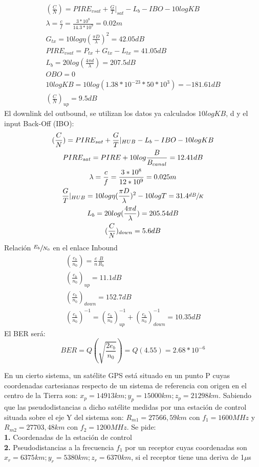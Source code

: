 \begin{exercise}[2]
\begin{gather*}
		(\frac{C}{N})=PIRE_{vsat}+\frac{G}{T}|_{sat}-L_b-IBO-10logKB\\
		\lambda=\frac{c}{f}=\frac{3*10^8}{14.3*10^9}=0.02m\\
		G_{tx}=10log\eta(\frac{\pi D}{\lambda})^2=42.05dB\\
		PIRE_{vsat}=P_{tx}+G_{tx}-L_{tx}=41.05dB\\
		L_b=20log(\frac{4\pi d}{\lambda})=207.5dB\\
		OBO=0\\
		10logKB=10log(1.38*10^{-23}*50*10^3)=-181.61dB\\
		(\frac{C}{N})_{up}=9.5dB
	\end{gather*}
	El downlink del outbound, se utilizan los datos ya calculados $10logKB$, d y el input Back-Off (IBO):
	\begin{gather*}
		(\frac{C}{N})=PIRE_{sat}+\frac{G}{T}|_{HUB}-L_b-IBO-10logKB\\
		PIRE_{sat}=PIRE+10log\frac{B}{B_{canal}}=12.41dB\\
		\lambda=\frac{c}{f}=\frac{3*10^8}{12*10^9}=0.025m\\
		\frac{G}{T}|_{HUB}=10log\eta(\frac{\pi D}{\lambda})^2-10logT=31.4\sfrac{dB}{K}\\
		L_b=20log(\frac{4\pi d}{\lambda})=205.54dB\\
		(\frac{C}{N})_{down}=5.6dB
	\end{gather*}
	Relación $\sfrac{E_b}{N_0}$ en el enlace Inbound
	\begin{gather*}
		(\frac{e_b}{n_0})=\frac{c}{n}\frac{B}{R_b}\\
		(\frac{e_b}{n_0})_{up}=11.1dB\\
		(\frac{e_b}{n_0})_{down}=152.7dB\\
		(\frac{e_b}{n_0})^{-1}=(\frac{e_b}{n_0})_{up}^{-1}+(\frac{e_b}{n_0})_{down}^{-1}=10.35dB
	\end{gather*}
	El BER será:
	\[BER=Q(\sqrt{\frac{2e_b}{n_0}})=Q(4.55)=2.68*10^{-6}\]
\end{exercise}
\begin{exercise}[3]
	En un cierto sistema, un satélite GPS está situado en un punto P cuyas coordenadas cartesianas respecto de un sistema de referencia con origen en el centro de la Tierra son: $x_p=14913km;y_p=15000km;z_p=21298km$. Sabiendo que las pseudodistancias a dicho satélite medidas por una estación de control situada sobre el eje Y del sistema son: $R_{m1}=27566,59km$ con $f_1=1600MHz$ y $R_{m2}=27703,48km$ con $f_2=1200MHz$. Se pide:\\
	\textbf{1.} Coordenadas de la estación de control \\
	\textbf{2.} Pseudodistancias a la frecuencia $f_1$ por un receptor cuyas coordenadas son $x_r=6375km;y_r=5380km;z_r=6370km$, si el receptor tiene una deriva de 1$\mu$s
\end{exercise}
